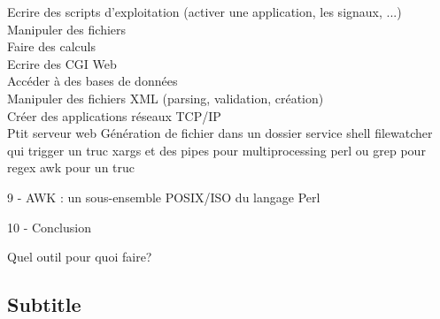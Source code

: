\documentclass[11pt,a4paper]{article}
\begin{document}
Ecrire des scripts d'exploitation (activer une application, les signaux, ...)\\
Manipuler des fichiers\\
Faire des calculs\\
Ecrire des CGI Web\\
Accéder à des bases de données\\
Manipuler des fichiers XML (parsing, validation, création)\\
Créer des applications réseaux TCP/IP\\

Ptit serveur web
Génération de fichier dans un dossier
service shell filewatcher qui trigger un truc
xargs et des pipes pour multiprocessing
perl ou grep pour regex
awk pour un truc

9 - AWK : un sous-ensemble POSIX/ISO du langage Perl

10 - Conclusion

Quel outil pour quoi faire?



\subsection*{Subtitle}
\end{document}
